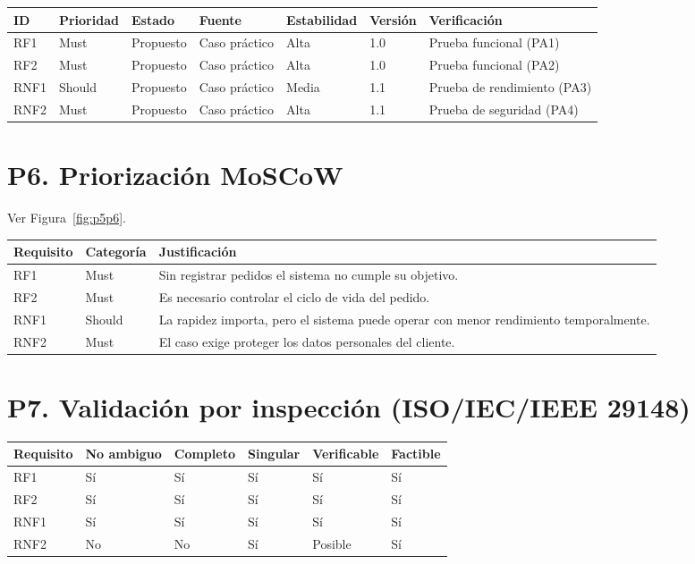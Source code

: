 \documentclass[11pt,a4paper]{article}
\begin{document}
	\begin{center}
		\begin{tabular}{@{}lllllll@{}}
			\toprule
			ID & Prioridad & Estado & Fuente & Estabilidad & Versión & Verificación \\
			\midrule
			RF1 & Must & Propuesto & Caso práctico & Alta & 1.0 & Prueba funcional (PA1) \\
			RF2 & Must & Propuesto & Caso práctico & Alta & 1.0 & Prueba funcional (PA2) \\
			RNF1 & Should & Propuesto & Caso práctico & Media & 1.1 & Prueba de rendimiento (PA3) \\
			RNF2 & Must & Propuesto & Caso práctico & Alta & 1.1 & Prueba de seguridad (PA4) \\
			\bottomrule
		\end{tabular}
	\end{center}
	
	\section{P6. Priorización MoSCoW}
	Ver Figura~\ref{fig:p5p6}.
	\begin{center}
		\begin{tabularx}{\linewidth}{@{}llX@{}}
			\toprule
			Requisito & Categoría & Justificación \\
			\midrule
			RF1 & Must & Sin registrar pedidos el sistema no cumple su objetivo. \\
			RF2 & Must & Es necesario controlar el ciclo de vida del pedido. \\
			RNF1 & Should & La rapidez importa, pero el sistema puede operar con menor rendimiento temporalmente. \\
			RNF2 & Must & El caso exige proteger los datos personales del cliente. \\
			\bottomrule
		\end{tabularx}
	\end{center}
	
	\newpage
	\section{P7. Validación por inspección (ISO/IEC/IEEE 29148)}
	
	
	\begin{center}
		\begin{tabular}{@{}llllll@{}}
			\toprule
			Requisito & No ambiguo & Completo & Singular & Verificable & Factible \\
			\midrule
			RF1 & Sí & Sí & Sí & Sí & Sí \\
			RF2 & Sí & Sí & Sí & Sí & Sí \\
			RNF1 & Sí & Sí & Sí & Sí & Sí \\
			RNF2 & No & No & Sí & Posible & Sí \\
			\bottomrule
		\end{tabular}
	\end{center}
	
\end{document}
